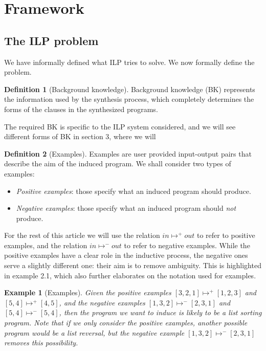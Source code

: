 \documentclass{article}
\newtheorem{example}{Example}
\theoremstyle{definition}
\newtheorem{defn}{Definition}[section]
\begin{document}
\section{Framework}
\subsection{The ILP problem}
We have informally defined what ILP tries to solve. We now formally define the problem.

\begin{defn}[Background knowledge]
Background knowledge (BK) represents the information used by the synthesis process, which completely determines the forms of the clauses in the synthesized programs.
\end{defn}
The required BK is specific to the ILP system considered, and we will see different forms of BK in section 3, where we will

\begin{defn}[Examples]
Examples are user provided input-output pairs that describe the aim of the induced program. We shall consider two types of examples:
\begin{itemize}
\item \textit{Positive examples}: those specify what an induced program should produce.
\item \textit{Negative examples}: those specify what an induced program should \emph{not} produce.
\end{itemize}
\end{defn}
For the rest of this article we will use the relation $in \mapsto^+ out$ to refer to positive examples, and the relation $in \mapsto^- out$ to refer to negative examples. While the positive examples have a clear role in the inductive process, the negative ones serve a slightly different one: their aim is to remove ambiguity. This is highlighted in example 2.1, which also further elaborates on the notation used for examples.

\begin{example}[Examples]
Given the positive examples $[3,2,1] \mapsto^+ [1,2,3]$ and $[5,4] \mapsto^+ [4,5]$, and the negative examples $[1,3,2] \mapsto^- [2,3,1]$ and $[5,4] \mapsto^- [5,4]$, then the program we want to induce is likely to be a list sorting program. Note that if we only consider the positive examples, another possible program would be a list reversal, but the negative example $[1,3,2] \mapsto^- [2,3,1]$ removes this possibility.
\end{example}
\end{document}
